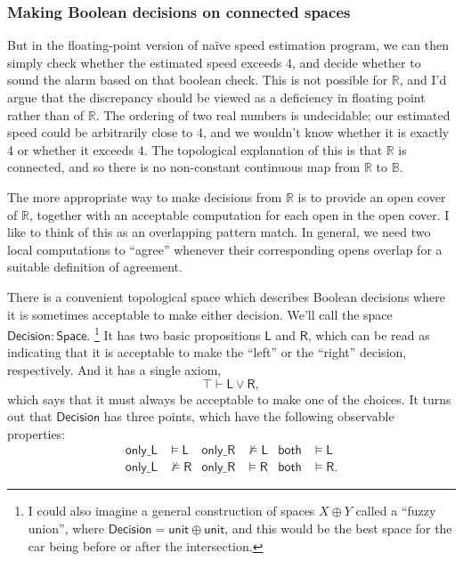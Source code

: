 \documentclass{article}           %
\newcommand{\R}{\mathbb{R}}
\newcommand{\bool}{\mathbb{B}}
\newcommand{\Space}{\mathsf{Space}}
\begin{document}
\subsubsection{Making Boolean decisions on connected spaces}
But in the floating-point version of naïve speed estimation program, we can then simply check whether the estimated speed exceeds 4, and decide whether to sound the alarm based on that boolean check. This is not possible for $\R$, and I'd argue that the discrepancy should be viewed as a deficiency in floating point rather than of $\R$. The ordering of two real numbers is undecidable; our estimated speed could be arbitrarily close to 4, and we wouldn't know whether it is exactly 4 or whether it exceeds 4. The topological explanation of this is that $\R$ is connected, and so there is no non-constant continuous map from $\R$ to $\bool$.

The more appropriate way to make decisions from $\R$ is to provide an open cover of $\R$, together with an acceptable computation for each open in the open cover. I like to think of this as an overlapping pattern match. In general, we need two local computations to ``agree'' whenever their corresponding opens overlap for a suitable definition of agreement.

There is a convenient topological space which describes Boolean decisions where it is sometimes acceptable to make either decision. We'll call the space $\mathsf{Decision} : \Space$.
\footnote{I could also imagine a general construction of spaces $X \oplus Y$ called a ``fuzzy union'', where $\mathsf{Decision} = \mathsf{unit} \oplus \mathsf{unit}$, and this would be the best space for the car being before or after the intersection.}
 It has two basic propositions $\mathsf{L}$ and $\mathsf{R}$, which can be read as indicating that it is acceptable to make the ``left'' or the ``right'' decision, respectively. And it has a single axiom,
\[
\top \vdash \mathsf{L} \vee \mathsf{R},
\]
which says that it must always be acceptable to make one of the choices. It turns out that $\mathsf{Decision}$ has three points, which have the following observable properties:
\begin{align*}
\mathsf{only\_L} &\models \mathsf{L}
& \mathsf{only\_R} & \nvDash \mathsf{L}
& \mathsf{both} &\models \mathsf{L}
\\
\mathsf{only\_L} &\nvDash \mathsf{R}
& \mathsf{only\_R} & \models \mathsf{R}
& \mathsf{both} &\models \mathsf{R}.
\end{align*}
\end{document}
